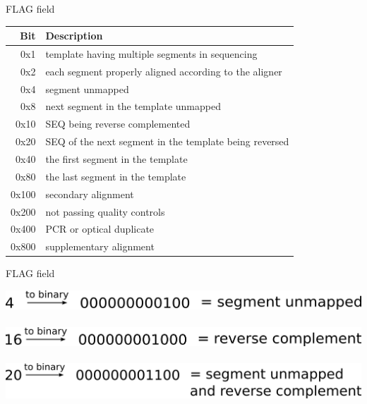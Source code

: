 \documentclass{beamer}
\begin{document}
\begin{frame}{FLAG field}
  \begin{tabular}{rl}
    \hline
    Bit & Description\\
    \hline
    0x1 &  template having multiple segments in sequencing \\
    0x2 &  each segment properly aligned according to the aligner \\
    0x4 &  segment unmapped \\
    0x8 &  next segment in the template unmapped \\
    0x10 &  {\sf SEQ} being reverse complemented \\
    0x20 &  {\sf SEQ} of the next segment in the template being reversed \\
    0x40 &  the first segment in the template \\
    0x80 &  the last segment in the template \\
    0x100 &  secondary alignment \\
    0x200 &  not passing quality controls \\
    0x400 &  PCR or optical duplicate \\
    0x800 &  supplementary alignment \\
    \hline
  \end{tabular}
\end{frame}

\begin{frame}{FLAG field}
  \begin{center}
    \includegraphics[width=\linewidth, keepaspectratio]{pic/f1.png}\\~\\
    \pause
    \includegraphics[width=\linewidth, keepaspectratio]{pic/f2.png}\\~\\
    \pause
    \includegraphics[width=\linewidth, keepaspectratio]{pic/f3.png}\\~\\
  \end{center}
\end{frame}
\end{document}
